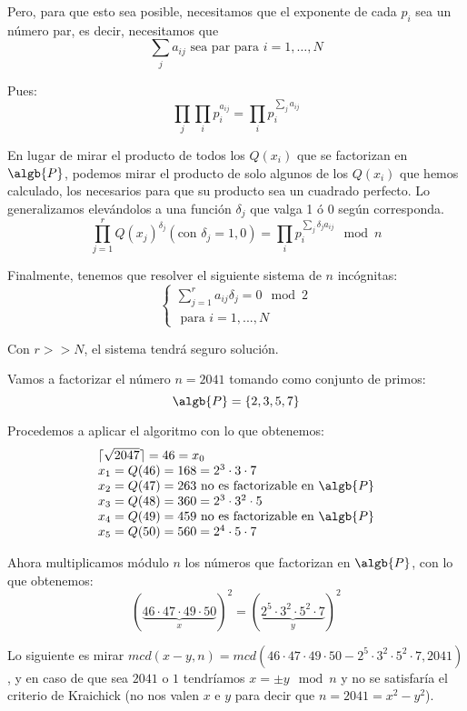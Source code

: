 \begin{mdframed}
Pero, para que esto sea posible, necesitamos que el exponente de cada $p_i$ sea un número par, es decir, necesitamos que
\[\sum_ja_{ij} \text{ sea par para } i={1,…,N}\]

Pues:
\[\prod_j\prod_ip_i^{a_{ij}} = \prod_i p_i^{\sum_ja_{ij}}\]

En lugar de mirar el producto de todos los $Q(x_i)$ que se factorizan en $\algb{P}$, podemos mirar el producto de solo algunos de los $Q(x_i)$ que hemos calculado, los necesarios para que su producto sea un cuadrado perfecto. Lo generalizamos elevándolos a una función $\delta_j$ que valga 1 ó 0 según corresponda.
\[\prod_{j=1}^r Q(x_j)^{δ_j} (\text{con } δ_j = 1,0)  = \prod_ip_i^{\sum_jδ_ja_{ij}} \mod n\]

Finalmente, tenemos que resolver el siguiente sistema de $n$ incógnitas:
\[\left\{ \begin{array}{l}
\sum\limits_{j=1}^{r}a_{ij}δ_j = 0 \mod 2 \\
\text{ para } i=1,...,N
\end{array}\right.\]

\obs Con $r >> N$, el sistema tendrá seguro solución.
\end{mdframed}

\begin{example}
Vamos a factorizar el número $n=2041$ tomando como conjunto de primos:
\[\algb{P} = \{ 2,3,5,7\}\]

Procedemos a aplicar el algoritmo con lo que obtenemos:
\[\begin{array}{l}
\lceil\sqrt{2047}\rceil = 46=x_0 \\
x_1 = Q(46)=168=2^3\cdot 3 \cdot 7 \\
x_2 = Q(47) = 263 \text{ no es factorizable en }\algb{P}\\
x_3 = Q(48) = 360 = 2^3\cdot 3^2 \cdot 5 \\
x_4 = Q(49) = 459 \text{ no es factorizable en }\algb{P}\\
x_5 = Q(50) = 560 = 2^4\cdot 5 \cdot 7
\end{array}\]

Ahora multiplicamos módulo $n$ los números que factorizan en $\algb{P}$, con lo que obtenemos:
\[(\underbrace{46\cdot 47 \cdot 49 \cdot 50}_{x})^2 = (\underbrace{2^5\cdot 3^2 \cdot 5^2 \cdot 7}_y)^2\]

Lo siguiente es mirar $mcd(x-y, n)=mcd(46\cdot 47 \cdot 49 \cdot 50 - 2^5\cdot 3^2 \cdot 5^2 \cdot 7, 2041)$, y en caso de que sea $2041$ o $1$ tendríamos $x=\pm y \mod n$ y no se satisfaría el criterio de Kraichick (no nos valen $x$ e $y$ para decir que $n=2041=x^2-y^2$).
\end{example}


